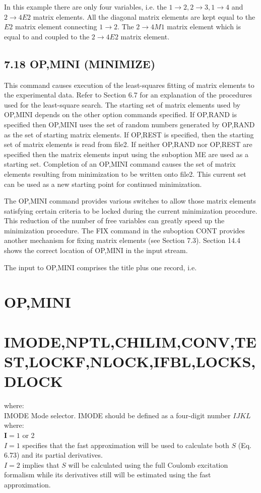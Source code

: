 \documentclass[10pt]{article}
\begin{document}
In this example there are only four variables, i.e. the $1 \rightarrow 2,2 \rightarrow 3,1 \rightarrow 4$ and $2 \rightarrow 4 E 2$ matrix elements. All the diagonal matrix elements are kept equal to the $E 2$ matrix element connecting $1 \rightarrow 2$. The $2 \rightarrow 4 M 1$ matrix element which is equal to and coupled to the $2 \rightarrow 4 E 2$ matrix element.

\subsection*{7.18 OP,MINI (MINIMIZE)}
This command causes execution of the least-squares fitting of matrix elements to the experimental data. Refer to Section 6.7 for an explanation of the procedures used for the least-square search. The starting set of matrix elements used by OP,MINI depends on the other option commands specified. If OP,RAND is specified then OP,MINI uses the set of random numbers generated by OP,RAND as the set of starting matrix elements. If OP,REST is specified, then the starting set of matrix elements is read from file2. If neither OP,RAND nor OP,REST are specified then the matrix elements input using the suboption ME are used as a starting set. Completion of an OP,MINI command causes the set of matrix elements resulting from minimization to be written onto file2. This current set can be used as a new starting point for continued minimization.

The OP,MINI command provides various switches to allow those matrix elements satisfying certain criteria to be locked during the current minimization procedure. This reduction of the number of free variables can greatly speed up the minimization procedure. The FIX command in the suboption CONT provides another mechanism for fixing matrix elements (see Section 7.3). Section 14.4 shows the correct location of OP,MINI in the input stream.

The input to OP,MINI comprises the title plus one record, i.e.

\section*{OP,MINI}
\section*{IMODE,NPTL,CHILIM,CONV,TEST,LOCKF,NLOCK,IFBL,LOCKS,DLOCK}
where:\\
IMODE Mode selector. IMODE should be defined as a four-digit number $I J K L$ where:\\
$\mathbf{I}=1$ or 2\\
$I=1$ specifies that the fast approximation will be used to calculate both $S$ (Eq. 6.73) and its partial derivatives.\\
$I=2$ implies that $S$ will be calculated using the full Coulomb excitation formalism while its derivatives still will be estimated using the fast approximation.
\end{document}
